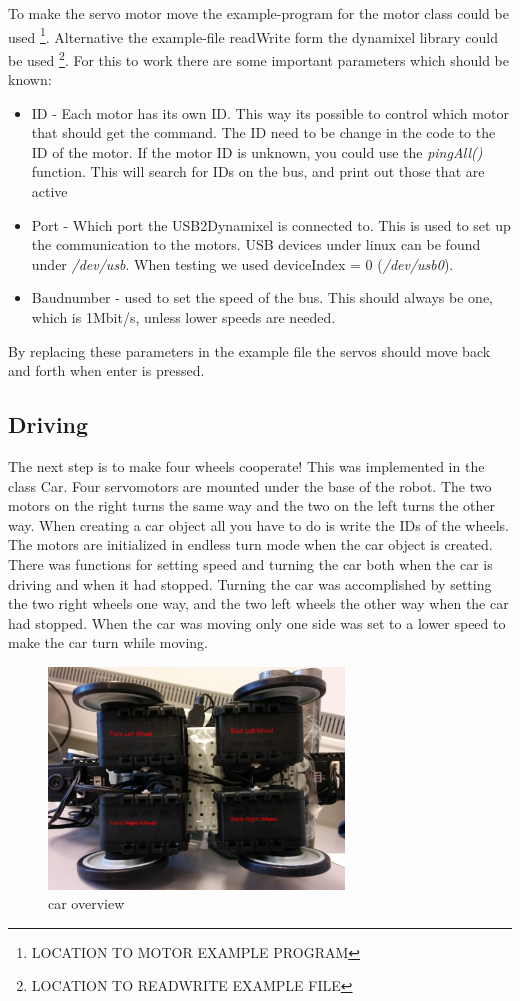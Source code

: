 To make the servo motor move the example-program for the motor class could be used \footnote{LOCATION TO MOTOR EXAMPLE PROGRAM}. Alternative the example-file readWrite form the dynamixel library could be used \footnote{LOCATION TO READWRITE EXAMPLE FILE}. 
For this to work there are some important parameters which should be known:
\begin{itemize}
     \item ID - Each motor has its own ID. This way its possible to control which motor that should get the command. The ID need to be change in the code to the ID of the motor. If the motor ID is unknown, you could use the \textit{pingAll()} function. This will search for IDs on the bus, and print out those that are active
     \item Port - Which port the USB2Dynamixel is connected to. This is used to set up the communication to the motors. USB devices under linux can be found under \textit{/dev/usb}. When testing we used deviceIndex = 0 (\textit{/dev/usb0}).
     \item Baudnumber - used to set the speed of the bus. This should always be one, which is 1Mbit/s, unless lower speeds are needed.
\end{itemize}
\bigskip

By replacing these parameters in the example file the servos should move back and forth when enter is pressed.


\subsection{Driving}
The next step is to make four wheels cooperate!
This was implemented in the class Car. Four servomotors are mounted under the base of the robot. The two motors on the right turns the same way and the two on the left turns the other way. When creating a car object all you have to do is write the IDs of the wheels. The motors are initialized in endless turn mode when the car object is created. There was functions for setting speed and turning the car both when the car is driving and when it had stopped. Turning the car was accomplished by setting the two right wheels one way, and the two left wheels the other way when the car had stopped. When the car was moving only one side was set to a lower speed to make the car turn while moving.


\begin{figure}[H]
    \centering
    \includegraphics[width=0.7\textwidth]{graphics/Car.png}
    \caption{car overview}
    \label{fig:car} 
\end{figure}


